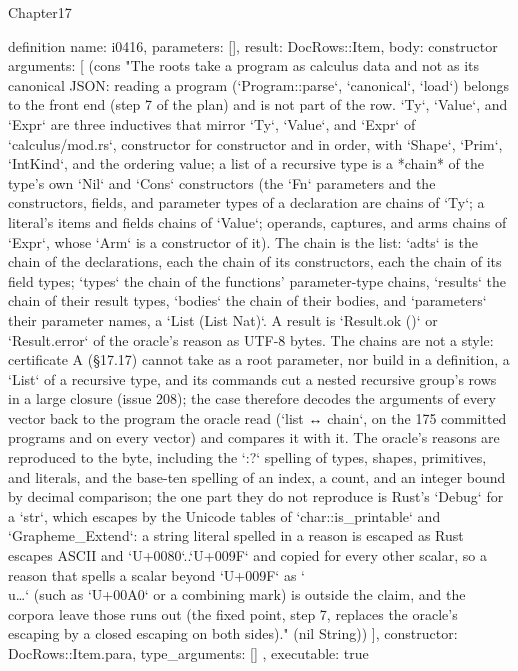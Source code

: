 \begin{lexlean}{Chapter17}
\begin{semanticmodule}
definition{
  name: i0416,
  parameters: [],
  result: DocRows::Item,
  body: constructor{
    arguments: [
      (cons "The roots take a program as calculus data and not as its canonical JSON: reading a program (`Program::parse`, `canonical`, `load`) belongs to the front end (step 7 of the plan) and is not part of the row. `Ty`, `Value`, and `Expr` are three inductives that mirror `Ty`, `Value`, and `Expr` of `calculus/mod.rs`, constructor for constructor and in order, with `Shape`, `Prim`, `IntKind`, and the ordering value; a list of a recursive type is a *chain* of the type's own `Nil` and `Cons` constructors (the `Fn` parameters and the constructors, fields, and parameter types of a declaration are chains of `Ty`; a literal's items and fields chains of `Value`; operands, captures, and arms chains of `Expr`, whose `Arm` is a constructor of it). The chain is the list: `adts` is the chain of the declarations, each the chain of its constructors, each the chain of its field types; `types` the chain of the functions' parameter-type chains, `results` the chain of their result types, `bodies` the chain of their bodies, and `parameters` their parameter names, a `List (List Nat)`. A result is `Result.ok ()` or `Result.error` of the oracle's reason as UTF-8 bytes. The chains are not a style: certificate A (§17.17) cannot take as a root parameter, nor build in a definition, a `List` of a recursive type, and its commands cut a nested recursive group's rows in a large closure (issue 208); the case therefore decodes the arguments of every vector back to the program the oracle read (`list ↔ chain`, on the 175 committed programs and on every vector) and compares it with it. The oracle's reasons are reproduced to the byte, including the `{:?}` spelling of types, shapes, primitives, and literals, and the base-ten spelling of an index, a count, and an integer bound by decimal comparison; the one part they do not reproduce is Rust's `Debug` for a `str`, which escapes by the Unicode tables of `char::is_printable` and `Grapheme_Extend`: a string literal spelled in a reason is escaped as Rust escapes ASCII and `U+0080`..`U+009F` and copied for every other scalar, so a reason that spells a scalar beyond `U+009F` as `\\u{…}` (such as `U+00A0` or a combining mark) is outside the claim, and the corpora leave those runs out (the fixed point, step 7, replaces the oracle's escaping by a closed escaping on both sides)." (nil String))
    ],
    constructor: DocRows::Item.para,
    type_arguments: []
  },
  executable: true
}


\end{semanticmodule}
\end{lexlean}
